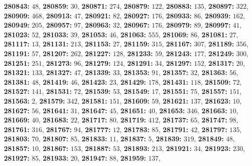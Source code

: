 \textsf{\bfseries 280843:} $48$, \textsf{\bfseries 280859:} $30$, \textsf{\bfseries 280871:} $274$, \textsf{\bfseries 280879:} $122$, \textsf{\bfseries 280883:} $135$, \textsf{\bfseries 280897:} $322$, \textsf{\bfseries 280909:} $468$, \textsf{\bfseries 280913:} $47$, \textsf{\bfseries 280921:} $82$, \textsf{\bfseries 280927:} $176$, \textsf{\bfseries 280933:} $86$, \textsf{\bfseries 280939:} $162$, \textsf{\bfseries 280949:} $205$, \textsf{\bfseries 280957:} $97$, \textsf{\bfseries 280963:} $32$, \textsf{\bfseries 280967:} $176$, \textsf{\bfseries 280979:} $89$, \textsf{\bfseries 280997:} $41$, \textsf{\bfseries 281023:} $52$, \textsf{\bfseries 281033:} $39$, \textsf{\bfseries 281053:} $46$, \textsf{\bfseries 281063:} $555$, \textsf{\bfseries 281069:} $86$, \textsf{\bfseries 281081:} $27$, \textsf{\bfseries 281117:} $13$, \textsf{\bfseries 281131:} $213$, \textsf{\bfseries 281153:} $27$, \textsf{\bfseries 281159:} $315$, \textsf{\bfseries 281167:} $307$, \textsf{\bfseries 281189:} $356$, \textsf{\bfseries 281191:} $57$, \textsf{\bfseries 281207:} $262$, \textsf{\bfseries 281227:} $128$, \textsf{\bfseries 281233:} $59$, \textsf{\bfseries 281243:} $177$, \textsf{\bfseries 281249:} $300$, \textsf{\bfseries 281251:} $251$, \textsf{\bfseries 281273:} $96$, \textsf{\bfseries 281279:} $124$, \textsf{\bfseries 281291:} $34$, \textsf{\bfseries 281297:} $152$, \textsf{\bfseries 281317:} $20$, \textsf{\bfseries 281321:} $133$, \textsf{\bfseries 281327:} $47$, \textsf{\bfseries 281339:} $33$, \textsf{\bfseries 281353:} $91$, \textsf{\bfseries 281357:} $32$, \textsf{\bfseries 281363:} $56$, \textsf{\bfseries 281381:} $48$, \textsf{\bfseries 281419:} $46$, \textsf{\bfseries 281423:} $23$, \textsf{\bfseries 281429:} $178$, \textsf{\bfseries 281431:} $118$, \textsf{\bfseries 281509:} $72$, \textsf{\bfseries 281527:} $141$, \textsf{\bfseries 281531:} $72$, \textsf{\bfseries 281539:} $53$, \textsf{\bfseries 281549:} $17$, \textsf{\bfseries 281551:} $75$, \textsf{\bfseries 281557:} $151$, \textsf{\bfseries 281563:} $2$, \textsf{\bfseries 281579:} $342$, \textsf{\bfseries 281581:} $151$, \textsf{\bfseries 281609:} $59$, \textsf{\bfseries 281621:} $137$, \textsf{\bfseries 281623:} $10$, \textsf{\bfseries 281627:} $56$, \textsf{\bfseries 281641:} $31$, \textsf{\bfseries 281647:} $45$, \textsf{\bfseries 281651:} $40$, \textsf{\bfseries 281653:} $346$, \textsf{\bfseries 281663:} $10$, \textsf{\bfseries 281669:} $40$, \textsf{\bfseries 281683:} $22$, \textsf{\bfseries 281717:} $80$, \textsf{\bfseries 281719:} $412$, \textsf{\bfseries 281737:} $65$, \textsf{\bfseries 281747:} $98$, \textsf{\bfseries 281761:} $316$, \textsf{\bfseries 281767:} $94$, \textsf{\bfseries 281777:} $12$, \textsf{\bfseries 281783:} $85$, \textsf{\bfseries 281791:} $42$, \textsf{\bfseries 281797:} $135$, \textsf{\bfseries 281803:} $70$, \textsf{\bfseries 281807:} $85$, \textsf{\bfseries 281833:} $11$, \textsf{\bfseries 281837:} $5$, \textsf{\bfseries 281839:} $319$, \textsf{\bfseries 281849:} $48$, \textsf{\bfseries 281857:} $10$, \textsf{\bfseries 281867:} $153$, \textsf{\bfseries 281887:} $53$, \textsf{\bfseries 281893:} $213$, \textsf{\bfseries 281921:} $34$, \textsf{\bfseries 281923:} $230$, \textsf{\bfseries 281927:} $85$, \textsf{\bfseries 281933:} $20$, \textsf{\bfseries 281947:} $88$, \textsf{\bfseries 281959:} $137$, 
